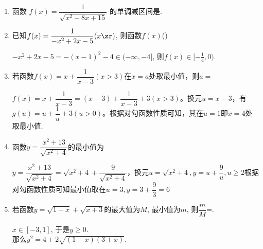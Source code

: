 \begin{enumerate}
    \item 函数 $f(x)=\dfrac{1}{\sqrt{x^2-8 x+15}}$ 的单调减区间是.
    \item 已知$f(x)=\dfrac{1}{-x^2+2x-5}(x\zr)$, 则函数$f(x)$\dotfill()
    \begin{jieda}
    $-x^2+2x-5=-(x-1)^2-4\in(-\infty,-4]$, 则$f(x)\in[-\frac{1}{4},0)$. 
    \end{jieda}
    \item 若函数$f(x) = x + \dfrac{1}{x-3} (x > 3)$在$x = a$处取最小值，则$a = $
    \begin{jieda}
        $f(x) = x + \dfrac{1}{x-3} = (x-3) + \dfrac{1}{x-3} + 3 (x > 3)$。换元$u = x-3$，有$g(u) = u + \dfrac{1}{u} + 3 (u > 0)$。根据对勾函数性质可知，其在$u = 1$即$x=4$处取最小值.
    \end{jieda}
    \item 函数$y = \dfrac{x^2+13}{\sqrt{x^2+4}}$的最小值为
    \begin{jieda}
        $y = \dfrac{x^2+13}{\sqrt{x^2+4}} = \sqrt{x^2+4} + \dfrac{9}{\sqrt{x^2+4}}$，换元$u = \sqrt{x^2+4}, y = u + \dfrac{9}{u}, u \geq 2$根据对勾函数性质可知最小值取在$u = 3, y = 3 + \dfrac{9}{3} = 6$
    \end{jieda}
    \item 若函数$y=\sqrt{1-x}+\sqrt{x+3}$的最大值为$M$, 最小值为$m$, 则$\dfrac{m}{M}$=. 
    \begin{jieda}
    $x\in[-3,1]$, 于是$y\geq 0$. \\
    那么$y^2=4+2\sqrt{(1-x)(3+x)}$. 
    \end{jieda}


\end{enumerate}
